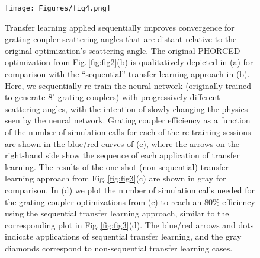 \documentclass{article}
\begin{document}
\begin{figure}[t!]
    \centering
    \texttt{[image: Figures/fig4.png]}
    \caption{Transfer learning applied sequentially improves convergence for grating coupler scattering angles that are distant relative to the original optimization's scattering angle. The original PHORCED optimization from Fig.\,\ref{fig:fig2}(b) is qualitatively depicted in (a) for comparison with the ``sequential'' transfer learning approach in (b). Here, we sequentially re-train the neural network (originally trained to generate $8^\circ$ grating couplers) with progressively different scattering angles, with the intention of slowly changing the physics seen by the neural network. Grating coupler efficiency as a function of the number of simulation calls for each of the re-training sessions are shown in the blue/red curves of (c), where the arrows on the right-hand side show the sequence of each application of transfer learning. The results of the one-shot (non-sequential) transfer learning approach from Fig.\,\ref{fig:fig3}(c) are shown in gray for comparison. In (d) we plot the number of simulation calls needed for the grating coupler optimizations from (c) to reach an 80\% efficiency using the sequential transfer learning approach, similar to the corresponding plot in Fig.\,\ref{fig:fig3}(d). The blue/red arrows and dots indicate applications of sequential transfer learning, and the gray diamonds correspond to non-sequential transfer learning cases.}
    \label{fig:fig4}
\end{figure}
\end{document}
